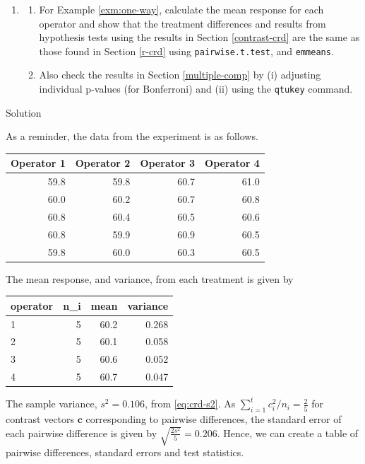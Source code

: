 \documentclass[
]{book}
\theoremstyle{definition}
\theoremstyle{definition}
\theoremstyle{definition}
\theoremstyle{definition}
\theoremstyle{remark}
\begin{document}
\begin{enumerate}
\def\labelenumi{\arabic{enumi}.}
\item
  \begin{enumerate}
  \def\labelenumii{\alph{enumii}.}
  \item
    For Example \ref{exm:one-way}, calculate the mean response for each operator and show that the treatment differences and results from hypothesis tests using the results in Section \ref{contrast-crd} are the same as those found in Section \ref{r-crd} using \texttt{pairwise.t.test}, and \texttt{emmeans}.
  \item
    Also check the results in Section \ref{multiple-comp} by (i) adjusting individual p-values (for Bonferroni) and (ii) using the \texttt{qtukey} command.
  \end{enumerate}
\end{enumerate}

Solution

As a reminder, the data from the experiment is as follows.

\begin{tabular}{r|r|r|r}
\hline
Operator 1 & Operator 2 & Operator 3 & Operator 4\\
\hline
59.8 & 59.8 & 60.7 & 61.0\\
\hline
60.0 & 60.2 & 60.7 & 60.8\\
\hline
60.8 & 60.4 & 60.5 & 60.6\\
\hline
60.8 & 59.9 & 60.9 & 60.5\\
\hline
59.8 & 60.0 & 60.3 & 60.5\\
\hline
\end{tabular}

The mean response, and variance, from each treatment is given by

\begin{tabular}{l|r|r|r}
\hline
operator & n\_i & mean & variance\\
\hline
1 & 5 & 60.2 & 0.268\\
\hline
2 & 5 & 60.1 & 0.058\\
\hline
3 & 5 & 60.6 & 0.052\\
\hline
4 & 5 & 60.7 & 0.047\\
\hline
\end{tabular}

The sample variance, \(s^2 = 0.106\), from \eqref{eq:crd-s2}. As \(\sum_{i=1}^tc_i^2/n_i = \frac{2}{5}\) for contrast vectors \(\boldsymbol{c}\) corresponding to pairwise differences, the standard error of each pairwise difference is given by \(\sqrt{\frac{2s^2}{5}} = 0.206\). Hence, we can create a table of pairwise differences, standard errors and test statistics.
\end{document}
